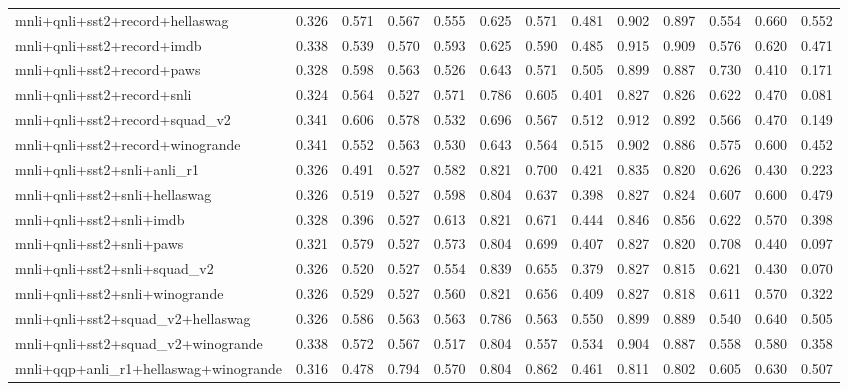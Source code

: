 \begin{table}[t]
\begin{tabular}{lrrrrrrrrrrrr}
    mnli+qnli+sst2+record+hellaswag & 0.326 & 0.571 & 0.567 & 0.555 & 0.625 & 0.571 & 0.481 & 0.902 & 0.897 & 0.554 & 0.660 & 0.552 \\
    mnli+qnli+sst2+record+imdb & 0.338 & 0.539 & 0.570 & 0.593 & 0.625 & 0.590 & 0.485 & 0.915 & 0.909 & 0.576 & 0.620 & 0.471 \\
    mnli+qnli+sst2+record+paws & 0.328 & 0.598 & 0.563 & 0.526 & 0.643 & 0.571 & 0.505 & 0.899 & 0.887 & 0.730 & 0.410 & 0.171 \\
    mnli+qnli+sst2+record+snli & 0.324 & 0.564 & 0.527 & 0.571 & 0.786 & 0.605 & 0.401 & 0.827 & 0.826 & 0.622 & 0.470 & 0.081 \\
    mnli+qnli+sst2+record+squad\_v2 & 0.341 & 0.606 & 0.578 & 0.532 & 0.696 & 0.567 & 0.512 & 0.912 & 0.892 & 0.566 & 0.470 & 0.149 \\
    mnli+qnli+sst2+record+winogrande & 0.341 & 0.552 & 0.563 & 0.530 & 0.643 & 0.564 & 0.515 & 0.902 & 0.886 & 0.575 & 0.600 & 0.452 \\
    mnli+qnli+sst2+snli+anli\_r1 & 0.326 & 0.491 & 0.527 & 0.582 & 0.821 & 0.700 & 0.421 & 0.835 & 0.820 & 0.626 & 0.430 & 0.223 \\
    mnli+qnli+sst2+snli+hellaswag & 0.326 & 0.519 & 0.527 & 0.598 & 0.804 & 0.637 & 0.398 & 0.827 & 0.824 & 0.607 & 0.600 & 0.479 \\
    mnli+qnli+sst2+snli+imdb & 0.328 & 0.396 & 0.527 & 0.613 & 0.821 & 0.671 & 0.444 & 0.846 & 0.856 & 0.622 & 0.570 & 0.398 \\
    mnli+qnli+sst2+snli+paws & 0.321 & 0.579 & 0.527 & 0.573 & 0.804 & 0.699 & 0.407 & 0.827 & 0.820 & 0.708 & 0.440 & 0.097 \\
    mnli+qnli+sst2+snli+squad\_v2 & 0.326 & 0.520 & 0.527 & 0.554 & 0.839 & 0.655 & 0.379 & 0.827 & 0.815 & 0.621 & 0.430 & 0.070 \\
    mnli+qnli+sst2+snli+winogrande & 0.326 & 0.529 & 0.527 & 0.560 & 0.821 & 0.656 & 0.409 & 0.827 & 0.818 & 0.611 & 0.570 & 0.322 \\
    mnli+qnli+sst2+squad\_v2+hellaswag & 0.326 & 0.586 & 0.563 & 0.563 & 0.786 & 0.563 & 0.550 & 0.899 & 0.889 & 0.540 & 0.640 & 0.505 \\
    mnli+qnli+sst2+squad\_v2+winogrande & 0.338 & 0.572 & 0.567 & 0.517 & 0.804 & 0.557 & 0.534 & 0.904 & 0.887 & 0.558 & 0.580 & 0.358 \\
    mnli+qqp+anli\_r1+hellaswag+winogrande & 0.316 & 0.478 & 0.794 & 0.570 & 0.804 & 0.862 & 0.461 & 0.811 & 0.802 & 0.605 & 0.630 & 0.507 \\

\end{tabular}
\end{table}
